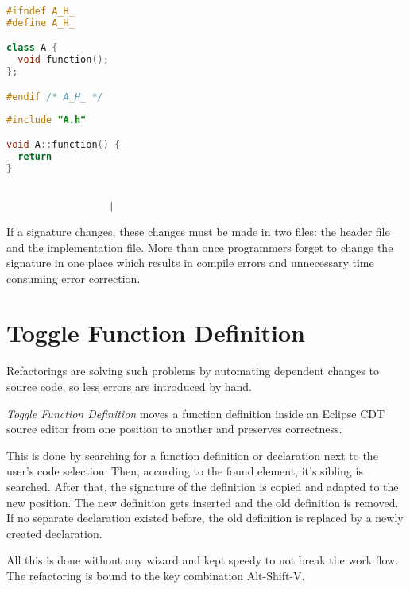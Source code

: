\vspace{0.5cm}
\begin{minipage}{.468\textwidth}
\lstset{xrightmargin=0.55cm}
\begin{lstlisting}[caption={Header file with a\newline declaration},
label={twofile1}, language=C++]
#ifndef A_H_
#define A_H_

class A {
  void function();
};

#endif /* A_H_ */
\end{lstlisting}
\end{minipage}%
\begin{minipage}{.492\textwidth}
\lstset{xleftmargin=0.55cm}
\begin{lstlisting}[caption={Source file containing definition},
label={twofile2}, language=C++ ]
#include "A.h"

void A::function() {
  return
}


	              |
\end{lstlisting}
\end{minipage}

If a signature changes, these changes must be made in two files: the header file
and the implementation file. More than once programmers forget to change the
signature in one place which results in compile errors and unnecessary time
consuming error correction.

\section*{Toggle Function Definition}

Refactorings are solving such problems by automating dependent changes to source
code, so less errors are introduced by hand.

\textit{Toggle Function Definition} moves a function definition inside an 
Eclipse CDT source editor from one position to another and preserves 
correctness.

This is done by searching for a function definition or declaration next to the
user's code selection. Then, according to the found
element, it's sibling is searched. After that, the signature of the definition is
copied and adapted to the new position. The new definition gets inserted and
the old definition is removed.
If no separate declaration existed before, the old definition is replaced by a 
newly created declaration.

All this is done without any wizard and kept speedy to not break the work flow.
The refactoring is bound to the key combination Alt-Shift-V.

